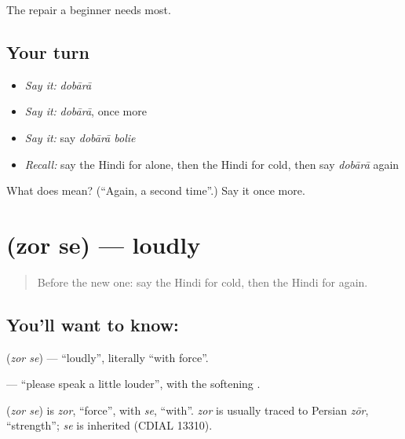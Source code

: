 \begin{grammarlens}[title={What you've built}]
The repair a beginner needs most.
\end{grammarlens}

\subsection*{Your turn}
\begin{itemize}
\raggedright
  \item \emph{Say it:} \emph{dobārā}
  \item \emph{Say it:} \emph{dobārā}, once more
  \item \emph{Say it:} say \emph{dobārā bolie}
  \item \emph{Recall:} say the Hindi for alone, then the Hindi for cold, then say \emph{dobārā} again
\end{itemize}

\begin{tcolorbox}[breakable,colback=teal!4,colframe=teal!35!black,title={Before you move on}]
What does  mean? (\textquotedblleft{}Again, a second time\textquotedblright{}.) Say it once more.
\end{tcolorbox}
\section[\texorpdfstring{\hi{ज़ोर} \hi{से} (zor se)}{ज़ोर से (zor se)}]{  (zor se) — loudly}

\label{lesson:HI-C110-zorse}



\begin{quote}
Before the new one: say the Hindi for cold, then the Hindi for again.
\end{quote}

\subsection*{You'll want to know:  }
\textbf{ } (\emph{zor se}) — \textquotedblleft{}loudly\textquotedblright{}, literally \textquotedblleft{}with force\textquotedblright{}.

\textbf{   } — \textquotedblleft{}please speak a little louder\textquotedblright{}, with the softening \textbf{}.

\begin{cousinweb}
\textbf{ } (\emph{zor se}) is \emph{zor}, \textquotedblleft{}force\textquotedblright{}, with \emph{se}, \textquotedblleft{}with\textquotedblright{}. \emph{zor} is usually traced to Persian \emph{zōr}, \textquotedblleft{}strength\textquotedblright{}; \emph{se} is inherited (CDIAL 13310).
\end{cousinweb}

